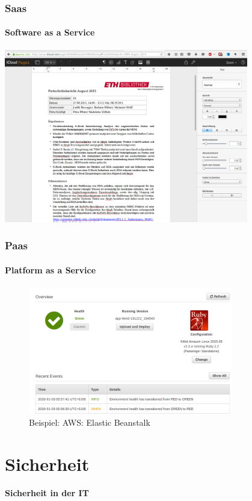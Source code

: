 \begin{frame}[c]\frametitle{Saas}
  \framesubtitle{Software as a Service}
    \begin{center}
      \includegraphics[width=0.8\textwidth]{pics/SaaS}
    \end{center}
\end{frame}

\begin{frame}[c]\frametitle{Paas}
  \framesubtitle{Platform as a Service}
  \begin{figure}
    \begin{center}
      \includegraphics[width=0.8\textwidth]{pics/aws-eb}
      \caption{Beispiel: AWS: Elastic Beanstalk}
    \end{center}
  \end{figure}
\end{frame}

\section{Sicherheit}

\begin{frame}[c]
\begin{center}
  \textbf{Sicherheit in der IT}
\end{center}
\end{frame}


